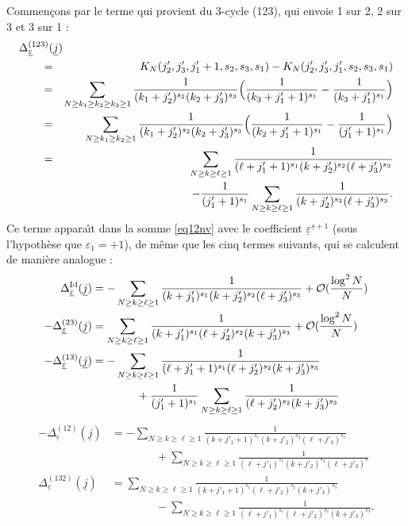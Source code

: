 \documentclass[12pt,francais, reqno]{smfart}
\numberwithin{equation}{section}
\newcommand{\Id}{{\rm Id}}
\newcommand{\gdo}{\mathcal{O}}
\newcommand{\eps}{\varepsilon}
\newcommand{\epssoul}{\underline{\eps}}
\newcommand{\jsoul}{\underline{j}}
\newcommand{\ssoul}{\underline{s}}
\begin{document}
Commen\c cons par le terme qui provient du 3-cycle (123), qui envoie 1 sur 2, 2 sur 3 et 3 sur 1 : 
\begin{eqnarray}
\lefteqn{\Delta_{\epssoul} ^{(123)} (\jsoul)}\nonumber \qquad \\
&=& K_N(j'_2 , j'_3, j'_1+1,  s_2, s_3, s_1) - K_N(j'_2 , j'_3, j'_1,  s_2, s_3, s_1) \nonumber \\
&=& \sum_{N \geq k_1 \geq k_2 \geq k_3 \geq 1} \frac{1}{(k_1+j'_2)^{s_2}(k_2+j'_3)^{s_3}} \Big(  \frac{1}{(k_3+j'_1+1)^{s_1}} -  \frac{1}{(k_3+j'_1)^{s_1}} \Big) \nonumber\\
&=& \sum_{N \geq k_1 \geq k_2  \geq 1} \frac{1}{(k_1+j'_2)^{s_2}(k_2+j'_3)^{s_3}} \Big(  
\frac{1}{(k_2+j'_1+1)^{s_1}} -  \frac{1}{(j'_1+1)^{s_1}} \Big) \nonumber\\
&=& \sum_{N \geq k \geq \ell  \geq 1} \frac{1}{(\ell+j'_1+1)^{s_1}(k+j'_2)^{s_2}(\ell+j'_3)^{s_3}}  \nonumber\\
&& \hspace{4cm} - \frac{1}{(j'_1+1)^{s_1}}  \sum_{N \geq k \geq \ell  \geq 1} \frac{1}{(k+j'_2)^{s_2}(\ell+j'_3)^{s_3}} .
															\label{eq30}
\end{eqnarray} 
Ce terme appara\^{\i}t dans la somme \eqref{eq12nv} avec le coefficient $\epssoul^{\ssoul+1}$ (sous l'hypoth\`ese que $\eps_1  = +1$), de m\^eme que les cinq termes suivants, qui se calculent de mani\`ere analogue : 
\begin{align}   
 \Delta_{\epssoul} ^{\Id} (\jsoul)
&= -  \sum_{N \geq k \geq \ell  \geq 1} \frac{1}{(k+j'_1)^{s_1}(k+j'_2)^{s_2}(\ell+j'_3)^{s_3}} 
+ \gdo ( \frac{\log^2 N}{N})\label{eq34}  \\
- \Delta_{\epssoul} ^{(23)} (\jsoul)
&=  \sum_{N \geq k \geq \ell  \geq 1} \frac{1}{(k+j'_1)^{s_1}(\ell +j'_2)^{s_2}(k+j'_3)^{s_3}} 
+ \gdo ( \frac{\log^2 N}{N})  \label{eq33}  \\
- \Delta_{\epssoul} ^{(13)} (\jsoul) 
&= -  \sum_{N \geq k \geq \ell  \geq 1} \frac{1}{(\ell+j'_1+1)^{s_1}(\ell+j'_2)^{s_2}(k+j'_3)^{s_3}} \label{eq32} \\
& \qquad \qquad + \frac{1}{(j'_1+1)^{s_1}}  \sum_{N \geq k \geq \ell  \geq 1} \frac{1}{(\ell+j'_2)^{s_2}(k+j'_3)^{s_3}}	\nonumber
\end{align}													
\begin{align}
- \Delta_{\epssoul} ^{(12)} (\jsoul) 
&= -  \sum_{N \geq k \geq \ell  \geq 1} \frac{1}{(k+j'_1+1)^{s_1}(k+j'_2)^{s_2}(\ell+j'_3)^{s_3}} \label{eq31} \\
& \qquad \qquad +    \sum_{N \geq k \geq \ell  \geq 1} \frac{1}{(\ell+j'_1)^{s_1}(k+j'_2)^{s_2}(\ell+j'_3)^{s}}\nonumber
\\	
\Delta_{\epssoul} ^{(132)} (\jsoul) 
&=   \sum_{N \geq k \geq \ell  \geq 1} \frac{1}{(k+j'_1+1)^{s_1}(\ell+j'_2)^{s_2}(k+j'_3)^{s_3}} 	\label{eq35} \\
&  \qquad \qquad -    \sum_{N \geq k \geq \ell  \geq 1} \frac{1}{(\ell+j'_1)^{s_1}(\ell+j'_2)^{s_2}(k+j'_3)^{s_3}} .	\nonumber
\end{align}															
\end{document}
